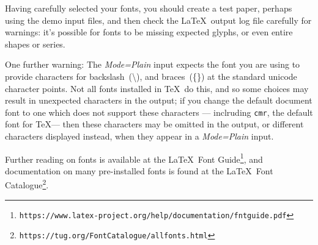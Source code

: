 \documentclass[a4paper,DIV=11]{scrartcl}
\begin{document}
Having carefully selected your fonts, you should create a test paper,
perhaps using the demo input files, and then check the \LaTeX\ output
log file carefully for warnings: it's possible for fonts to be missing
expected glyphs, or even entire shapes or series.

One further warning: The \textit{Mode=Plain} input expects the font
you are using to provide characters for backslash~(\textbackslash),
and braces~(\{\}) at the standard unicode character points. Not all
fonts installed in \TeX\ do this, and so some choices may result in
unexpected characters in the output; if you change the default
document font to one which does not support these characters ---
inclruding \texttt{cmr}, the default font for \TeX --- then these
characters may be omitted in the output, or different characters
displayed instead, when they appear in a \textit{Mode=Plain} input.


Further reading on fonts is available at the \LaTeX\ Font
Guide\footnote{\texttt{https://www.latex-project.org/help/documentation/fntguide.pdf}},
and documentation on many pre-installed fonts is found at the \LaTeX\ Font
Catalogue\footnote{\texttt{https://tug.org/FontCatalogue/allfonts.html}}.
\end{document}
